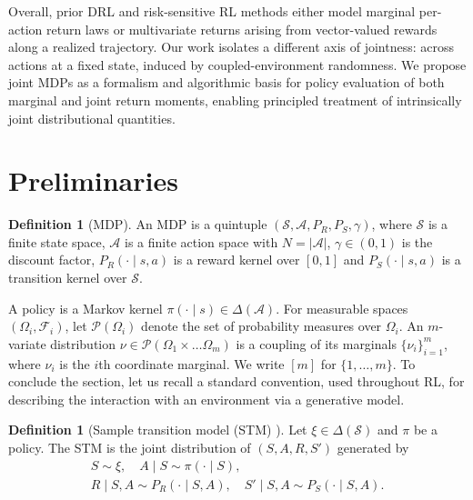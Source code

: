 \documentclass[accepted]{uai2026}
\theoremstyle{plain}
\theoremstyle{definition}
\newtheorem{definition}[theorem]{Definition}
\theoremstyle{remark}
\newcommand{\A}{\mathcal{A}}
\newcommand{\Ss}{\mathcal{S}}
\newcommand{\1}{\mathbbm{1}}
\newcommand{\abs}[1]{\left\lvert #1\right\rvert}
\begin{document}
Overall, prior DRL and risk-sensitive RL methods either model marginal per-action return laws or multivariate returns arising from vector-valued rewards along a realized trajectory. Our work isolates a different axis of jointness: across actions at a fixed state, induced by coupled-environment randomness. We propose joint MDPs as a formalism and algorithmic basis for policy evaluation of both marginal and joint return moments, enabling principled treatment of intrinsically joint distributional quantities.

\section{Preliminaries}\label{sec:preliminaries}
\begin{definition}[MDP] 
An MDP is a quintuple $(\Ss, \allowbreak\A, \allowbreak P_R, \allowbreak P_S, \allowbreak \gamma)$, where $\Ss$ is a finite state space, $\A$ is a finite action space with $N = \abs{\A}$, $\gamma \in (0, 1)$ is the discount factor, $P_R(\cdot \mid s, a)$ is a reward kernel over $[0, 1]$ and $P_S(\cdot\mid s,a)$ is a transition kernel over $\Ss$.
\end{definition}

A policy is a Markov kernel $\pi(\cdot \mid s) \in \Delta(\A)$. For measurable spaces $(\Omega_i, \mathcal{F}_i)$, let $\mathcal{P}(\Omega_i)$ denote the set of probability measures over $\Omega_i$. An $m$-variate distribution $\nu \in \mathcal{P}(\Omega_1 \times \ldots \Omega_m)$ is a coupling of its marginals $\{ \nu_i\}_{i=1}^m$, where $\nu_i$ is the $i$th coordinate marginal. We write $[m]$ for $\{1, \ldots, m\}$. To conclude the section, let us recall a standard convention, used throughout RL, for describing the interaction with an environment via a generative model.

\begin{definition}[Sample transition model (STM) \citep{DRL-textbook}]\label{def:stm}
Let $\xi \in \Delta(\Ss)$ and $\pi$ be a policy. The STM is the joint distribution of $(S, A, R, S')$ generated by
\begin{equation}
\begin{gathered}
S \sim \xi, \quad A \mid S \sim \pi(\cdot \mid S), \\
R \mid S, A \sim P_R(\cdot \mid S, A), \quad
S' \mid S, A \sim P_S(\cdot \mid S, A).
\end{gathered}
\end{equation}
\end{definition}
\end{document}
